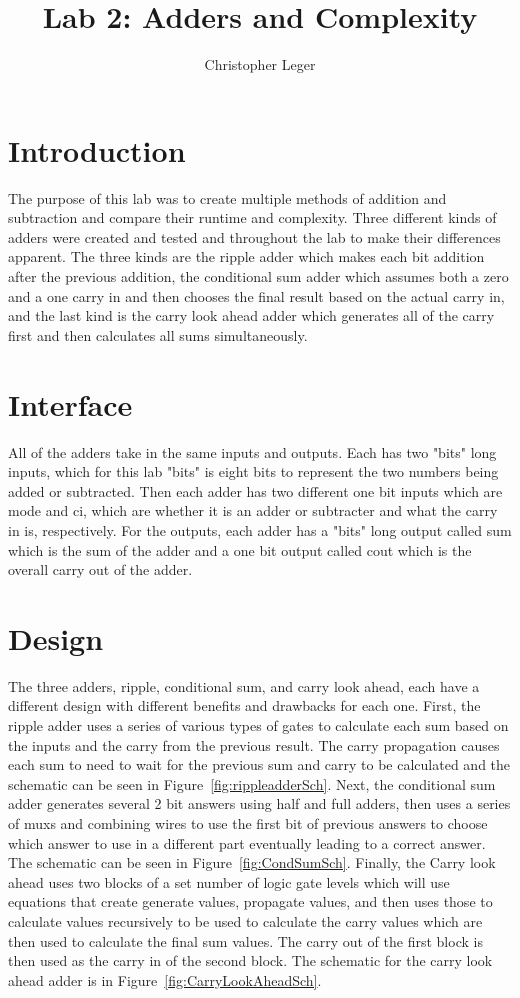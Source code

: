 \documentclass{article}\usepackage{graphicx} %
\author{Christopher Leger}
\title{Lab 2: Adders and Complexity}
\begin{document}
\maketitle

\section{Introduction}
The purpose of this lab was to create multiple methods of addition and subtraction and compare their runtime and complexity. Three different kinds of adders were created and tested and throughout the lab to make their differences apparent. The three kinds are the ripple adder which makes each bit addition after the previous addition, the conditional sum adder which assumes both a zero and a one carry in and then chooses the final result based on the actual carry in, and the last kind is the carry look ahead adder which generates all of the carry first and then calculates all sums simultaneously. 
\section{Interface}
All of the adders take in the same inputs and outputs. Each has two "bits" long inputs, which for this lab "bits" is eight bits to represent the two numbers being added or subtracted. Then each adder has two different one bit inputs which are mode and ci, which are whether it is an adder or subtracter and what the carry in is, respectively. For the outputs, each adder has a "bits" long output called sum which is the sum of the adder and a one bit output called cout which is the overall carry out of the adder.
\section{Design}
The three adders, ripple, conditional sum, and carry look ahead, each have a different design with different benefits and drawbacks for each one. First, the ripple adder uses a series of various types of gates to calculate each sum based on the inputs and the carry from the previous result. The carry propagation causes each sum to need to wait for the previous sum and carry to be calculated and the schematic can be seen in Figure~\ref{fig:rippleadderSch}. Next, the conditional sum adder generates several 2 bit answers using half and full adders, then uses a series of muxs and combining wires to use the first bit of previous answers to choose which answer to use in a different part eventually leading to a correct answer. The schematic can be seen in Figure~\ref{fig:CondSumSch}. Finally, the Carry look ahead uses two blocks of a set number of logic gate levels which will use equations that create generate values, propagate values, and then uses those to calculate values recursively to be used to calculate the carry values which are then used to calculate the final sum values. The carry out of the first block is then used as the carry in of the second block. The schematic for the carry look ahead adder is in Figure~\ref{fig:CarryLookAheadSch}.
\end{document}
